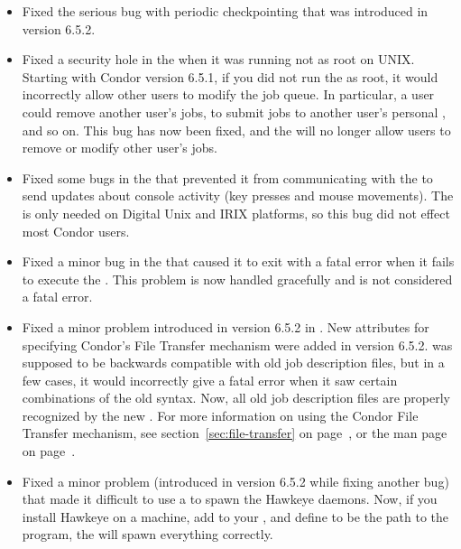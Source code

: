 \begin{itemize}

\item Fixed the serious bug with periodic checkpointing that was
  introduced in version 6.5.2.

\item Fixed a security hole in the  when it was running
  not as root on UNIX.
  Starting with Condor version 6.5.1, if you did not run the
   as root, it would incorrectly allow other users to
  modify the job queue.
  In particular, a user could remove another user's jobs, to submit
  jobs to another user's personal , and so on.
  This bug has now been fixed, and the  will no longer
  allow users to remove or modify other user's jobs.

\item Fixed some bugs in the  that prevented it from
  communicating with the  to send updates about console
  activity (key presses and mouse movements).
  The  is only needed on Digital Unix and IRIX platforms,
  so this bug did not effect most Condor users.

\item Fixed a minor bug in the  that caused it to exit
  with a fatal error when it fails to execute the . 
  This problem is now handled gracefully and is not considered a fatal
  error. 

\item Fixed a minor problem introduced in version 6.5.2 in
  .
  New attributes for specifying Condor's File Transfer mechanism were
  added in version 6.5.2.
   was supposed to be backwards compatible with old job
  description files, but in a few cases, it would incorrectly give a
  fatal error when it saw certain combinations of the old syntax.
  Now, all old job description files are properly recognized by the
  new .
  For more information on using the Condor File Transfer mechanism,
  see section~\ref{sec:file-transfer} on
  page~\pageref{sec:file-transfer}, or the  man
  page on page~\pageref{man-condor-submit}.

\item Fixed a minor problem (introduced in version 6.5.2 while fixing
  another bug) that made it difficult to use a  to
  spawn the Hawkeye daemons.
  Now, if you install Hawkeye on a machine, add \verb@HAWKEYE@ to your
  , and define  to be the path to
  the  program, the  will spawn
  everything correctly.


\end{itemize}
